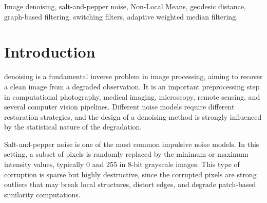 \documentclass{ieeeaccess}
\begin{document}
\begin{keywords}
Image denoising, salt-and-pepper noise, Non-Local Means, geodesic distance, graph-based filtering, switching filters, adaptive weighted median filtering.
\end{keywords}

\titlepgskip=-21pt
\maketitle

\section{Introduction}
\label{sec:introduction}

 denoising is a fundamental inverse problem in image processing, aiming to recover a clean image from a degraded observation. It is an important preprocessing step in computational photography, medical imaging, microscopy, remote sensing, and several computer vision pipelines. Different noise models require different restoration strategies, and the design of a denoising method is strongly influenced by the statistical nature of the degradation.

Salt-and-pepper noise is one of the most common impulsive noise models. In this setting, a subset of pixels is randomly replaced by the minimum or maximum intensity values, typically 0 and 255 in 8-bit grayscale images. This type of corruption is sparse but highly destructive, since the corrupted pixels are strong outliers that may break local structures, distort edges, and degrade patch-based similarity computations.
\end{document}
